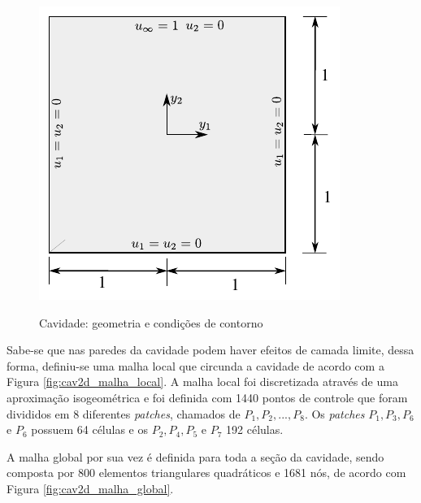 \begin{figure}[!htbp]
	\caption{Cavidade: geometria e condições de contorno} 
	\centering
	{\includegraphics[scale=1.3,trim=0cm 0cm 0cm 0cm, clip=true]{Imagens/Cap5/cav2d_geometria.pdf}}
	\label{fig:cav2d_geometria}
\end{figure}

Sabe-se que nas paredes da cavidade podem haver efeitos de camada limite, dessa forma, definiu-se uma malha local que circunda a cavidade de acordo com a Figura \ref{fig:cav2d_malha_local}. A malha local foi discretizada através de uma aproximação isogeométrica e foi definida com 1440 pontos de controle que foram divididos em 8 diferentes \textit{patches}, chamados de $P_{1},P_{2},...,P_{8}$. Os \textit{patches} $P_{1},P_{3},P_{6}$ e $P_{6}$ possuem 64 células e os $P_{2},P_{4},P_{5}$ e $P_{7}$ 192 células.

A malha global por sua vez é definida para toda a seção da cavidade, sendo composta por 800 elementos triangulares quadráticos e 1681 nós, de acordo com Figura \ref{fig:cav2d_malha_global}.

